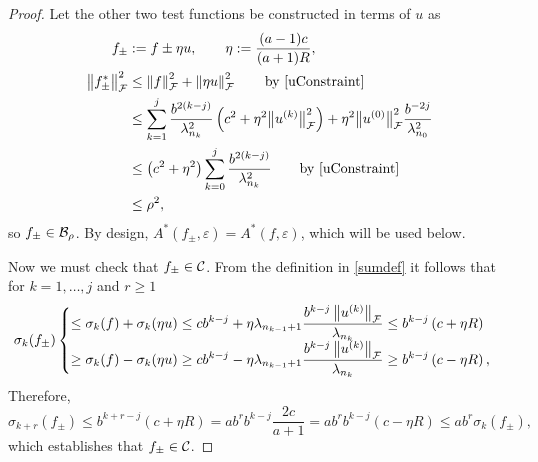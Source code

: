 \documentclass[final]{elsarticle}
\theoremstyle{definition}
\theoremstyle{remark}
\begin{document}
\begin{proof}
Let the other two test functions be constructed in terms of $u$ as 
\begin{align}
\label{etadef}
f_\pm & := f \pm \eta u, \qquad \eta : =  \frac {(a-1)c}{(a+1)R}, \\
\nonumber
\norm[\cf]{f^*_\pm}^2 & \le \norm[\cf]{f}^2 + \norm[\cf]{\eta u }^2 \qquad \text{by \eqref{uConstraint}} \\
& \le \sum_{k=1}^j \frac{ b^{2(k-j)}}{\lambda^2_{n_{k}}} \left(c^2+ \eta^2 \bignorm[\cf]{u^{(k)}}^2\right) + \eta^2 \bignorm[\cf]{u^{(0)}}^2 \frac{b^{-2j}}{\lambda_{n_0}^2}\\
\nonumber
& \le  \left(c^2+ \eta^2 \right) \sum_{k=0}^j \frac{ b^{2(k-j)}}{\lambda^2_{n_{k}}}  \qquad \text{by \eqref{uConstraint}}\\
&  \le \rho^2,
\end{align} 
so $f_{\pm} \in \cb_{\rho}$.  By design, $A^*(f_\pm,\varepsilon) = A^*(f,\varepsilon)$, which will be used below.

Now we must check that $f_\pm \in \cc$. From the definition in \eqref{sumdef} it follows that for $k = 1, \ldots, j$ and $r \ge 1$
\begin{equation*}
\sigma_k(f_\pm)  \begin{cases} 
\displaystyle
\le \sigma_k(f) + \sigma_k(\eta u)\le 
c b^{k-j} + \eta\lambda_{n_{k-1}+1}\frac{b^{k-j}\norm[\cf]{u^{(k)} } }{\lambda_{n_k}}
\le b^{k-j}\left(c+\eta R \right) 
\\[1ex]
\displaystyle
\ge \sigma_k(f) - \sigma_k(\eta u)\ge 
c b^{k-j} - \eta\lambda_{n_{k-1}+1}\frac{b^{k-j}\norm[\cf]{u^{(k)} } }{\lambda_{n_k}}
\ge b^{k-j}\left(c-\eta R \right) , 
\end{cases}
\end{equation*}
Therefore, 
\begin{equation*}
\sigma_{k+r}(f_\pm)
\le b^{k+r-j}(c+\eta R) = ab^r b^{k-j}\frac{2c}{a+1}
=ab^r b^{k-j}\left(c-\eta R \right) \le a b^r \sigma_{k}(f_\pm),
\end{equation*}
which establishes that $f_\pm \in \cc$.


\end{proof}
\end{document}
